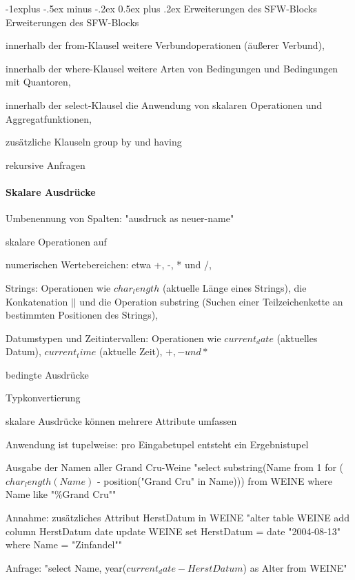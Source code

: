\documentclass[a4paper]{article}
\makeatletter
\renewcommand{\subsection}{\@startsection{subsection}{2}{0mm}%
                                {-1explus -.5ex minus -.2ex}%
                                {0.5ex plus .2ex}%
                                {\normalfont\normalsize\bfseries}}
\makeatother
\begin{document}
\begin{multicols}{3}
\subsection{Erweiterungen des SFW-Blocks}
Erweiterungen des SFW-Blocks
\begin{itemize*}
    \item innerhalb der from-Klausel weitere Verbundoperationen (äußerer Verbund),
    \item innerhalb der where-Klausel weitere Arten von Bedingungen und Bedingungen mit Quantoren,
    \item innerhalb der select-Klausel die Anwendung von skalaren Operationen und Aggregatfunktionen,
    \item zusätzliche Klauseln group by und having
    \item rekursive Anfragen
\end{itemize*}

\paragraph{Skalare Ausdrücke}
Umbenennung von Spalten: "ausdruck as neuer-name"
\begin{itemize*}
    \item skalare Operationen auf
    \begin{itemize*}
        \item numerischen Wertebereichen: etwa +, -, * und /,
        \item Strings: Operationen wie $char_length$ (aktuelle Länge eines Strings), die Konkatenation $||$ und die Operation substring (Suchen einer Teilzeichenkette an bestimmten Positionen des Strings),
        \item Datumstypen und Zeitintervallen: Operationen wie $current_date$ (aktuelles Datum), $current_time$ (aktuelle Zeit), $+, - und *$
    \end{itemize*}
    \item bedingte Ausdrücke
    \item Typkonvertierung
    \item skalare Ausdrücke können mehrere Attribute umfassen
    \item Anwendung ist tupelweise: pro Eingabetupel entsteht ein Ergebnistupel
    \item Ausgabe der Namen aller Grand Cru-Weine
    "select substring(Name from 1 for ($char_length(Name)$ - position("Grand Cru" in Name))) from WEINE where Name like "\%Grand Cru""
    \item Annahme: zusätzliches Attribut HerstDatum in WEINE
    "alter table WEINE add column HerstDatum date update WEINE set HerstDatum = date "2004-08-13" where Name = "Zinfandel""
    \item Anfrage: "select Name, year($current_date - HerstDatum$) as Alter from WEINE"
\end{itemize*}


\end{multicols}
\end{document}
